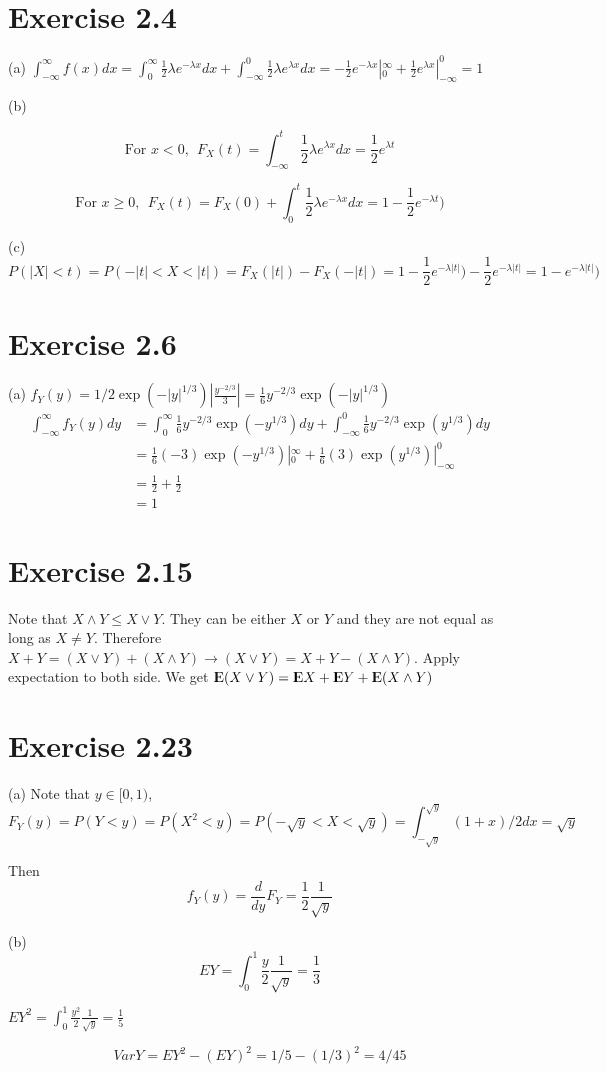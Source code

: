 \documentclass[12pt]{article}
\begin{document}
\section*{Exercise 2.4}
(a) $\int^{\infty}_{-\infty} f(x)dx =  \int^{\infty}_0 \frac{1}{2}\lambda e^{-\lambda x} dx + \int^0_{-\infty} \frac{1}{2}\lambda e^{\lambda x} dx  = -\frac{1}{2} e^{-\lambda x} |^{\infty}_0 + \frac{1}{2} e^{\lambda x} |_{-\infty}^0 = 1$

(b) 

$$\mbox{For } x < 0,\ \  F_X(t) = \int^t_{-\infty} \frac{1}{2}\lambda e^{\lambda x} dx = \frac{1}{2} e^{\lambda t} $$

$$\mbox{For } x \geq 0, \ \  F_X(t) = F_X(0) + \int^{t}_0 \frac{1}{2}\lambda e^{-\lambda x} dx =1 - \frac{1}{2}e^{-\lambda t})$$


(c) $$P(|X| < t) = P(-|t| < X < |t|) = F_X(|t|) - F_X(-|t|) = 1-  \frac{1}{2}e^{-\lambda |t|}) - \frac{1}{2} e^{- \lambda |t|} =  1 - e^{-\lambda |t|})$$

\section*{Exercise 2.6}
(a) $f_Y(y) = 1/2 \exp(-|y|^{1/3}) |\frac{y^{-2/3}}{3}| = \frac{1}{6} y^{-2/3} \exp(-|y|^{1/3})$
$$\begin{aligned}
\int_{-\infty}^{\infty} f_Y(y)dy &= \int_{0}^{\infty} \frac{1}{6} y^{-2/3} \exp(-y^{1/3}) dy + \int_{-\infty}^{0} \frac{1}{6} y^{-2/3} \exp(y^{1/3}) dy \\
&=  \frac{1}{6} (-3)\exp(-y^{1/3}) |_{0}^{\infty} + \frac{1}{6} (3) \exp(y^{1/3}) |_{-\infty}^{0} \\
&=  \frac{1}{2} + \frac{1}{2} \\
&= 1
\end{aligned}
$$

\section*{Exercise 2.15}
Note that $X \wedge Y \leq X\vee Y$. They can be either $X$ or $Y$ and they are not equal as long as $X\neq Y$. Therefore $X+Y = (X \vee Y) + (X \wedge Y) \rightarrow (X \vee Y) = X+Y - (X \wedge Y)$. Apply expectation to both side. We get ${\rm I\kern-.3em E}(X \vee Y) = {\rm I\kern-.3em E} X + {\rm I\kern-.3em E} Y + {\rm I\kern-.3em E}(X \wedge Y)$

\section*{Exercise 2.23}
(a) Note that $y \in [0, 1)$, $$F_Y(y) = P(Y < y) = P(X^2 < y) = P(-\sqrt{y} < X < \sqrt{y}) = \int^{\sqrt{y}}_{-\sqrt{y}} (1+x)/2 dx = \sqrt{y}$$

Then $$f_Y(y) = \frac{d}{dy}F_Y = \frac{1}{2}\frac{1}{\sqrt{y}}$$

(b) $$EY = \int^{1}_{0} \frac{y}{2}\frac{1}{\sqrt{y}} = \frac{1}{3}$$

$EY^2 = \int^1_0 \frac{y^2}{2} \frac{1}{\sqrt{y}} = \frac{1}{5}$

$$VarY = EY^2 - (EY)^2 = 1/5 - (1/3)^2 = 4/45 $$
\end{document}
